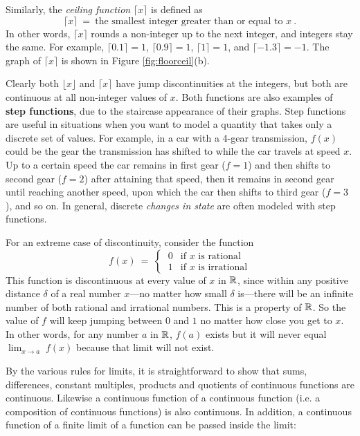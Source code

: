 \begin{exmp}
\noindent Similarly, the \emph{ceiling function}
$\lceil x \rceil$ is defined as
\[
\lceil x \rceil ~=~ \text{the smallest integer greater than or equal to $x$} ~.
\]
In other words, $\lceil x \rceil$ rounds a non-integer up to the next integer,
and integers stay the same. For example,
$\lceil 0.1 \rceil = 1$, $\lceil 0.9 \rceil = 1$,
$\lceil 1 \rceil = 1$, and $\lceil -1.3 \rceil = -1$. The graph of
$\lceil x \rceil$ is shown in Figure \ref{fig:floorceil}(b).

Clearly both $\lfloor x \rfloor$ and $\lceil x \rceil$ have jump discontinuities
at the integers, but both are continuous at all non-integer values of $x$. Both
functions are also examples of
\textbf{step functions},
due to the staircase appearance of their graphs. Step functions are useful in
situations when you want to model a quantity that takes only a discrete set of
values. For example, in a car with a 4-gear transmission, $f(x)$ could be the
gear the transmission has shifted to while the car travels at speed $x$. Up to a
certain speed the car remains in first gear ($f = 1$) and then shifts to second
gear ($f = 2$) after attaining that speed, then it remains in second gear until
reaching another speed, upon which the car then shifts to third gear ($f = 3$),
and so on. In general, discrete \emph{changes in state} are often modeled with
step functions.
\end{exmp}
\begin{exmp}\label{exmp:discontall}
\noindent For an extreme case of discontinuity, consider the function
\[
f(x) ~=~ \begin{cases}
           ~0  & \text{if $x$ is rational}\\
           ~1  & \text{if $x$ is irrational}
         \end{cases}
\]
This function is discontinuous at every value of $x$ in $\mathbb{R}$, since within
any positive distance $\delta$ of a real number $x$---no matter how small
$\delta$ is---there will be an infinite number of both rational and irrational
numbers. This is a property of $\mathbb{R}$. So the value of $f$ will keep jumping
between $0$ and $1$ no matter how close you get to $x$. In other words, for any
number $a$ in $\mathbb{R}$, $f(a)$ exists but it will never equal
$\lim_{x \to a}\;f(x)$ because that limit will not exist.
\end{exmp}
\divider
\vspace{3mm}

By the various rules for limits, it is straightforward to show that sums,
differences, constant multiples, products and quotients of continuous functions
are continuous. Likewise a continuous function of a continuous function (i.e. a
composition of continuous functions) is also continuous. In addition, a
continuous function of a finite limit of a function can be passed inside the
limit:


